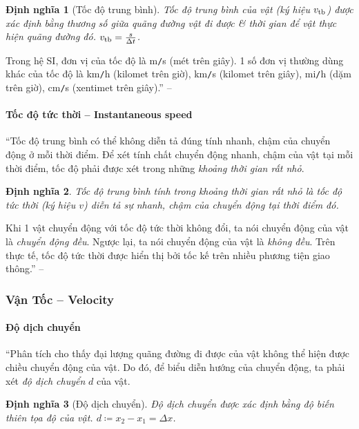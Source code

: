 \documentclass{article}
\numberwithin{equation}{section}
\newtheorem{dinhnghia}{Định nghĩa}[section]
\begin{document}
\begin{dinhnghia}[Tốc độ trung bình]
	\emph{Tốc độ trung bình} của vật (ký hiệu $v_{\rm tb}$) được xác định bằng thương số giữa quãng đường vật đi được \& thời gian để vật thực hiện quãng đường đó. $v_{\rm tb} = \frac{s}{\Delta t}$.
\end{dinhnghia}
Trong hệ SI, đơn vị của tốc độ là m\texttt{/}s (mét trên giây). 1 số đơn vị thường dùng khác của tốc độ là km\texttt{/}h (kilomet trên giờ), km\texttt{/}s (kilomet trên giây), mi\texttt{/}h (dặm trên giờ), cm\texttt{/}s (xentimet trên giây).'' -- \cite[pp. 25]{SGK_Vat_Ly_10_Chan_Troi_Sang_Tao}

\paragraph{Tốc độ tức thời -- Instantaneous speed}
``Tốc độ trung bình có thể không diễn tả đúng tính nhanh, chậm của chuyển động ở mỗi thời điểm. Để xét tính chất chuyển động nhanh, chậm của vật tại mỗi thời điểm, tốc độ phải được xét trong những \textit{khoảng thời gian rất nhỏ}.

\begin{dinhnghia}
	Tốc độ trung bình tính trong khoảng thời gian rất nhỏ là \emph{tốc độ tức thời} (ký hiệu $v$) diễn tả sự nhanh, chậm của chuyển động tại thời điểm đó.
\end{dinhnghia}
Khi 1 vật chuyển động với tốc độ tức thời không đổi, ta nói chuyển động của vật là \textit{chuyển động đều}. Ngược lại, ta nói chuyển động của vật là \textit{không đều}. Trên thực tế, tốc độ tức thời được hiển thị bởi tốc kế trên nhiều phương tiện giao thông.'' -- \cite[pp. 25]{SGK_Vat_Ly_10_Chan_Troi_Sang_Tao}

\subsubsection{Vận Tốc -- Velocity}

\paragraph{Độ dịch chuyển}
``Phân tích cho thấy đại lượng quãng đường đi được của vật không thể hiện được chiều chuyển động của vật. Do đó, để biểu diễn hướng của chuyển động, ta phải xét \textit{độ dịch chuyển} $d$ của vật.

\begin{dinhnghia}[Độ dịch chuyển]
	\emph{Độ dịch chuyển} được xác định bằng độ biến thiên tọa độ của vật. $d\coloneqq x_2 - x_1 = \Delta x$.
\end{dinhnghia}
\end{document}
